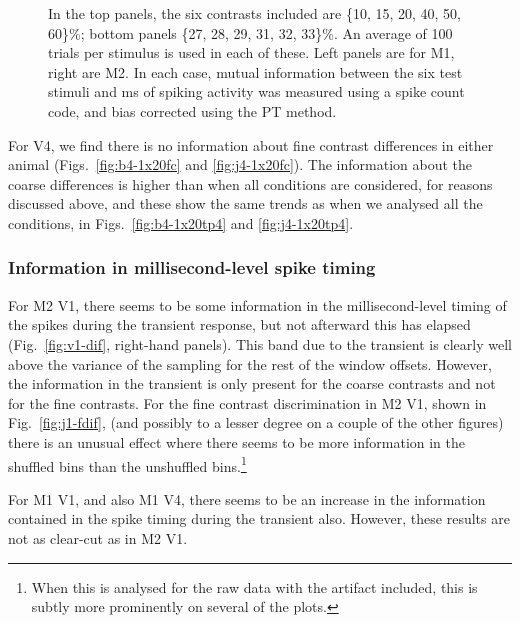 \begin{figure}[htbp]
{%
In the top panels, the six contrasts included are \{10, 15, 20, 40, 50, 60\}\%; bottom panels \{27, 28, 29, 31, 32, 33\}\%. An average of 100 trials per stimulus is used in each of these.
Left panels are for M1, right are M2.
In each case, mutual information between the six test stimuli and \unit[20]{ms} of spiking activity was measured using a spike count code, and bias corrected using the PT method.
}
    \label{fig:v4-fvc}
\end{figure}

For V4, we find there is no information about fine contrast differences in either animal (Figs.~\ref{fig:b4-1x20fc} and \ref{fig:j4-1x20fc}). The information about the coarse differences is higher than when all conditions are considered, for reasons discussed above, and these show the same trends as when we analysed all the conditions, in Figs.~\ref{fig:b4-1x20tp4} and \ref{fig:j4-1x20tp4}.

\FloatBarrier
\subsubsection{Information in millisecond-level spike timing}

For M2 V1, there seems to be some information in the millisecond-level timing of the spikes during the transient response, but not afterward this has elapsed (Fig.~\ref{fig:v1-dif}, right-hand panels). This band due to the transient is clearly well above the variance of the sampling for the rest of the window offsets.
However, the information in the transient is only present for the coarse contrasts and not for the fine contrasts.
For the fine contrast discrimination in M2 V1, shown in Fig.~\ref{fig:j1-fdif}, (and possibly to a lesser degree on a couple of the other figures) there is an unusual effect where there seems to be more information in the shuffled bins than the unshuffled bins.\footnote{When this is analysed for the raw data with the artifact included, this is subtly more prominently on several of the plots.}

For M1 V1, and also M1 V4, there seems to be an increase in the information contained in the spike timing during the transient also. However, these results are not as clear-cut as in M2 V1.

